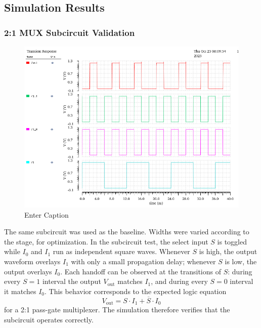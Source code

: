 \documentclass[12pt]{article}
\begin{document}
\newpage

\subsection{Simulation Results}
\subsubsection*{2:1 MUX Subcircuit Validation}
\begin{figure}[H]
    \centering
    \includegraphics[width=0.5\linewidth]{writeup//figures/muxsubval.png}
    \caption{Enter Caption}
\end{figure}

The same subcircuit was used as the baseline. Widths were varied according to the stage, for optimization. In the subcircuit test, the select input \( S \) is toggled while \( I_0 \) and \( I_1 \) run as independent square waves. 
Whenever \( S \) is high, the output waveform overlays \( I_1 \) with only a small propagation delay; whenever \( S \) is low, the output overlays \( I_0 \). 
Each handoff can be observed at the transitions of \( S \): during every \( S=1 \) interval the output \( V_{\text{out}} \) matches \( I_1 \), and during every \( S=0 \) interval it matches \( I_0 \). 
This behavior corresponds to the expected logic equation 
\[
V_{\text{out}} = S \cdot I_1 + \overline{S} \cdot I_0
\]
for a 2:1 pass-gate multiplexer. 
The simulation therefore verifies that the subcircuit operates correctly.
\end{document}
